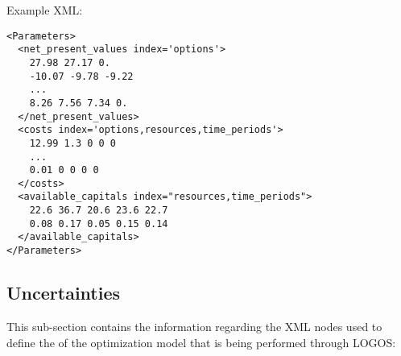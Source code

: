 Example XML:
\begin{lstlisting}[style=XML]
<Parameters>
  <net_present_values index='options'>
    27.98 27.17 0.
    -10.07 -9.78 -9.22
    ...
    8.26 7.56 7.34 0.
  </net_present_values>
  <costs index='options,resources,time_periods'>
    12.99 1.3 0 0 0
    ...
    0.01 0 0 0 0
  </costs>
  <available_capitals index="resources,time_periods">
    22.6 36.7 20.6 23.6 22.7
    0.08 0.17 0.05 0.15 0.14
  </available_capitals>
</Parameters>
\end{lstlisting}


%
\subsection{Uncertainties}
\label{subsec:Uncertainties}
This sub-section contains the information regarding the XML nodes used to define the
 of the optimization model that is being performed through LOGOS:
